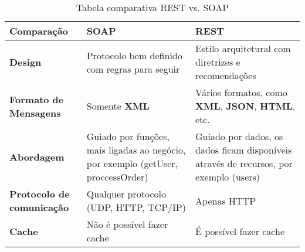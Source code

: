 \begin{table}[!htb]
    \centering
    \caption[REST vs. SOAP]{Tabela comparativa REST vs. SOAP
    \label{tab:rest-vs-soap}}
    \begin{tabular}{|m{3cm}|m{6cm}|m{6cm}|}
        \toprule
            Comparação & \textbf{SOAP} & \textbf{REST} \\
        \midrule
            \textbf{Design} & Protocolo bem definido com regras para seguir & Estilo arquitetural com diretrizes e recomendações\\
            \textbf{Formato de Mensagens} & Somente \textbf{XML} & Vários formatos, como \textbf{XML}, \textbf{JSON}, \textbf{HTML}, etc. \\
            \textbf{Abordagem} & Guiado por funções, mais ligadas ao negócio, por exemplo (getUser, proccessOrder) & Guiado por dados, os dados ficam disponíveis através de recursos, por exemplo (users) \\
            \textbf{Protocolo de comunicação} & Qualquer protocolo (UDP, HTTP, TCP/IP) & Apenas HTTP \\
            \textbf{Cache} & Não é possível fazer cache & É possível fazer cache \\
        \bottomrule
    \end{tabular}
\end{table}